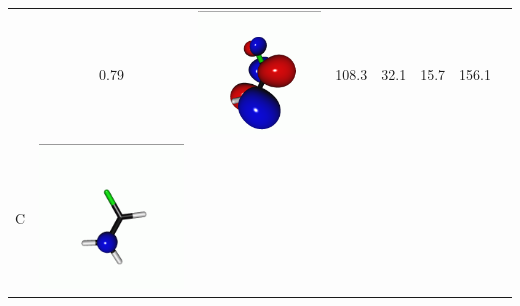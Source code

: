 \documentclass[journal=jctcce,manuscript=article]{achemso}
\begin{document}
\begin{table}[H]
\begin{tabular}{ c | c c c | c c c c}
\begin{minipage}{0.2\textwidth}
     \end{minipage}
     & 0.79
     &  \begin{minipage}{0.2\textwidth}
         \centering
         \includegraphics[scale=0.10]{NTO/CH2CHF/2p.png}
     \end{minipage}
     & 108.3
     & 32.1
     & 15.7 
     & 156.1
     \\
             C &  
     \begin{minipage}{0.2\textwidth}
         \centering
         \includegraphics[scale=0.10]{NTO/CH2CHF/4h.png}

\end{minipage}
\end{tabular}
\end{table}
\end{document}
